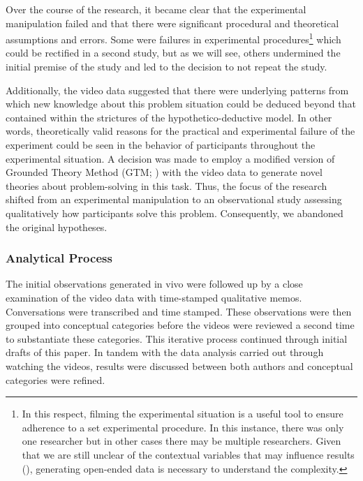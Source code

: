 \documentclass[twocolumn, serif, empirical, authordate]{jote-article}
\begin{document}
{{Over the course of the research, it became clear that the experimental manipulation failed and that there were significant procedural and theoretical assumptions and errors. Some were failures in experimental procedures\footnote{ In this respect, filming the experimental situation is a useful tool to ensure adherence to a set experimental procedure.
 In this instance, there was only one researcher but in other cases there may be multiple researchers. Given that we are still unclear of the contextual variables that may influence results (), generating open-ended data is necessary to understand the complexity.} which could be rectified in a second study, but as we will see, others undermined the initial premise of the study and led to the decision to not repeat the study.

Additionally, the video data suggested that there were underlying patterns from which new knowledge about this problem situation could be deduced beyond that contained within the strictures of the hypothetico-deductive model. In other words, theoretically valid reasons for the practical and experimental failure of the experiment could be seen in the behavior of participants throughout the experimental situation. A decision was made to employ a modified version of Grounded Theory Method (GTM; ) with the video data to generate novel theories about problem-solving in this task. Thus, the focus of the research shifted from an experimental manipulation to an observational study assessing qualitatively how participants solve this problem. Consequently, we abandoned the original hypotheses.


\subsubsection{Analytical Process}

The initial observations generated in vivo were followed up by a close examination of the video data with time-stamped qualitative memos.
Conversations were transcribed and time stamped. These observations were then grouped into conceptual categories before the videos were reviewed a second time to substantiate these categories. This iterative process continued through initial drafts of this paper. In tandem with the data analysis carried out through watching the videos, results were discussed between both authors and conceptual categories were refined.


}}
\end{document}
